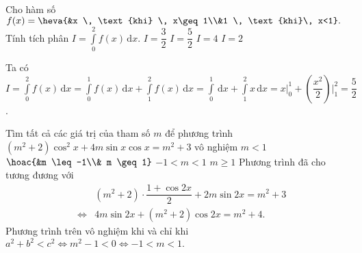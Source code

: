 \begin{ex}%
	Cho hàm số $f(x)= \heva{&x \, \text{khi} \, x\geq 1\\&1 \, \text{khi}\, x<1}.$ Tính tích phân $I=\displaystyle\int\limits_0^2 f(x)\mathrm{\,d}x$.
		\choice
	{$I=\dfrac{3}{2}$}
	{\True $I=\dfrac{5}{2}$}
	{$I=4$}
	{$I=2$}
	\loigiai
	{ Ta có $I=\displaystyle\int\limits_0^2 f(x)\mathrm{\,d}x= \displaystyle\int\limits_0^1 f(x)\mathrm{\,d}x +\displaystyle\int\limits_1^2 f(x)\mathrm{\,d}x =\displaystyle\int\limits_0^1\mathrm{\,d}x +\displaystyle\int\limits_1^2 x\mathrm{\,d}x = x\Bigr\rvert_0^1+ \left( \dfrac{x^2}{2}\right)\Bigr\rvert_1^2 =\dfrac{5}{2}$.
		
	}
\end{ex}

\begin{ex}%
	Tìm tất cả các giá trị của tham số $m$ để phương trình $(m^2+2) \cos^2 x +4m \sin x \cos x =m^2+3$ vô nghiệm
		\choice
	{$m<1$}
	{$\hoac{&m \leq -1\\& m \geq 1}$}
	{\True $-1<m<1$}
	{$m \geq 1$}
	\loigiai
	{ Phương trình đã cho tương đương với  
		\begin{eqnarray*}
			& &(m^2+2)\cdot \dfrac{1+\cos 2x}{2}+2m \sin 2x =m^2+3\\
			& \Leftrightarrow & 4m\sin 2x + (m^2+2) \cos 2x = m^2+4.	
		\end{eqnarray*}
	Phương trình trên vô nghiệm khi và chỉ khi $a^2+b^2<c^2 \Leftrightarrow m^2-1<0  \Leftrightarrow -1<m<1.$
	}
\end{ex}

